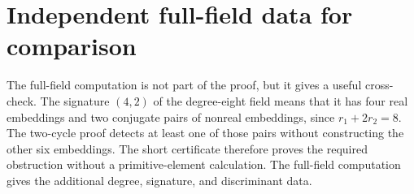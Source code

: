 \documentclass[11pt]{article}
\numberwithin{equation}{section}
\theoremstyle{definition}
\theoremstyle{remark}
\begin{document}
\section{Independent full-field data for comparison}
\label{app:full-field}

The full-field computation is not part of the proof, but it gives a useful
cross-check.  The signature \((4,2)\) of the degree-eight field means that it
has four real embeddings and two conjugate pairs of nonreal embeddings,
since \(r_1+2r_2=8\).  The two-cycle proof detects at least one of those pairs
without constructing the other six embeddings.  The short certificate
therefore proves the required obstruction without a
primitive-element calculation.  The full-field computation gives the
additional degree, signature, and discriminant data.


\begingroup
\raggedright

\endgroup
\end{document}

